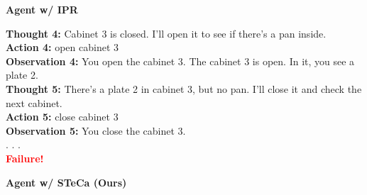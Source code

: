 \begin{tcolorbox}[breakable,title=Case Study on the ALFWorld Benchmark]
\begin{multicols}{2}
\begin{center}\textbf{Agent w/ IPR}\end{center}
\textcolor{case_blue}{\textbf{Thought 4:}} Cabinet 3 is closed. I'll open it to see if there's a pan inside.\\
\textcolor{case_blue}{\textbf{Action 4:}} open cabinet 3\\
\textcolor{case_purple}{\textbf{Observation 4:}} You open the cabinet 3. The cabinet 3 is open. In it, you see a plate 2.\\
\textcolor{case_blue}{\textbf{Thought 5:}} There's a plate 2 in cabinet 3, but no pan. I'll close it and check the next cabinet.\\
\textcolor{case_blue}{\textbf{Action 5:}} close cabinet 3\\
\textcolor{case_purple}{\textbf{Observation 5:}} You close the cabinet 3.\\
. . .\\
\textcolor{red}{\textbf{Failure!}}
\columnbreak

\begin{center}{\textbf{Agent w/ STeCa (Ours)}}\end{center}


\end{multicols}
\end{tcolorbox}
